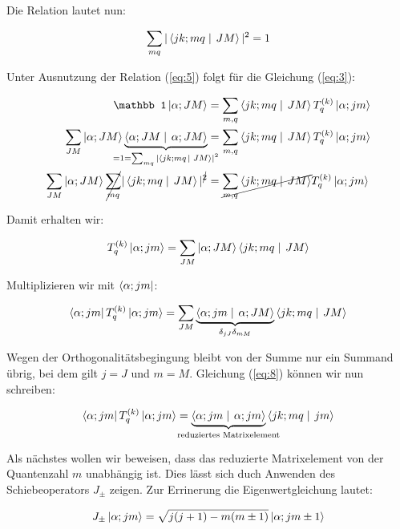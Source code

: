 Die Relation lautet nun:

\begin{equation}
  \label{eq:5}
  \sum_{mq}|\braket{jk;mq}{JM} |^2 = 1
\end{equation}

Unter Ausnutzung der Relation (\ref{eq:5}) folgt für die Gleichung (\ref{eq:3}):

\begin{align}
  \label{eq:6}
   \mathbb 1 \ket{\alpha; JM} &=  \sum_{m,q} \braket{jk;mq}{JM} T^{(k)}_q  \ket{\alpha;jm} \\
 \sum_{JM} \ket{\alpha; JM}\underbr{\braket{\alpha; JM}{\alpha; JM}}_{=1=\sum_{mq}|\braket{jk;mq}{JM} |^2} &=  \sum_{m,q} \braket{jk;mq}{JM} T^{(k)}_q  \ket{\alpha;jm} \\
\sum_{JM}\ket{\alpha; JM} \cancel{\sum_{mq}}|\braket{jk;mq}{JM} |^{\cancel 2}   &= \cancel{\sum_{m,q} \braket{jk;mq}{JM}} T^{(k)}_q  \ket{\alpha;jm} 
\end{align}

Damit erhalten wir:

\begin{equation}
  \label{eq:7}
   T^{(k)}_q  \ket{\alpha;jm} = \sum_{JM}\ket{\alpha; JM} \braket{jk;mq}{JM}
\end{equation}

Multiplizieren wir mit \(\left\langle \alpha;jm \right|\):

\begin{equation}
  \label{eq:8}
  \bra{\alpha;jm} T^{(k)}_q  \ket{\alpha;jm} = \sum_{JM} \underbr{\braket{\alpha;jm}{\alpha; JM}}_{\delta_{jJ}\delta_{mM}} \braket{jk;mq}{JM}
\end{equation}

Wegen der Orthogonalitätsbegingung bleibt von der Summe nur ein Summand übrig, bei dem gilt \(j=J\) und \(m=M\). Gleichung (\ref{eq:8}) können wir nun schreiben:

\begin{equation}
  \label{eq:9}
   \bra{\alpha;jm} T^{(k)}_q  \ket{\alpha;jm} = \underbr{\braket{\alpha;jm}{\alpha; jm}}_{\text{reduziertes Matrixelement}}  \braket{jk;mq}{jm}
\end{equation}


Als nächstes wollen wir beweisen, dass das reduzierte Matrixelement von der Quantenzahl \(m\) unabhängig ist. Dies lässt sich duch Anwenden des Schiebeoperators \(J_{\pm}\) zeigen. Zur Errinerung die Eigenwertgleichung lautet:

\begin{equation}
  \label{eq:11}
  J_{\pm}\left| \alpha; jm \right\rangle = \sqrt{j(j+1)-m(m\pm 1)} \left| \alpha; jm\pm 1 \right\rangle
\end{equation}

